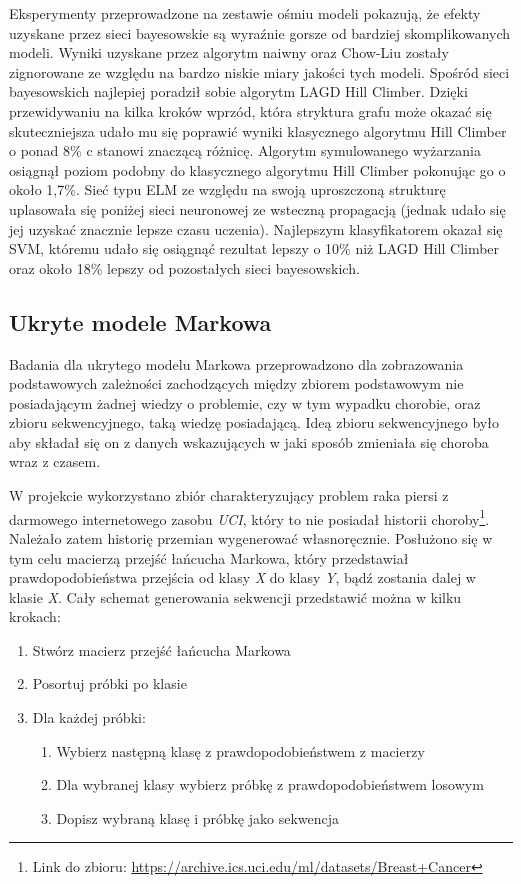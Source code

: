 Eksperymenty przeprowadzone na zestawie ośmiu modeli pokazują, że efekty uzyskane przez sieci bayesowskie są wyraźnie gorsze od bardziej skomplikowanych modeli. Wyniki uzyskane przez algorytm naiwny oraz Chow-Liu  zostały zignorowane ze względu na bardzo niskie miary jakości tych modeli. Spośród sieci bayesowskich najlepiej poradził sobie algorytm LAGD Hill Climber. Dzięki przewidywaniu na kilka kroków wprzód, która stryktura grafu może okazać się skuteczniejsza udało mu się poprawić wyniki klasycznego algorytmu Hill Climber o ponad 8\% c stanowi znaczącą różnicę. Algorytm symulowanego wyżarzania osiągnął poziom podobny do klasycznego algorytmu Hill Climber pokonując go o około 1,7\%. Sieć typu ELM ze względu na swoją uproszczoną strukturę uplasowała się poniżej sieci neuronowej ze wsteczną propagacją (jednak udało się jej uzyskać znacznie lepsze czasu uczenia).  Najlepszym klasyfikatorem okazał się SVM, któremu udało się osiągnąć rezultat lepszy o 10\% niż LAGD Hill Climber oraz około 18\% lepszy od pozostałych sieci bayesowskich.  

\newpage

\subsection{Ukryte modele Markowa}

Badania dla ukrytego modelu Markowa przeprowadzono dla zobrazowania podstawowych zależności zachodzących między zbiorem podstawowym nie posiadającym żadnej wiedzy o problemie, czy w tym wypadku chorobie, oraz zbioru sekwencyjnego, taką wiedzę posiadającą. Ideą zbioru sekwencyjnego było aby składał się on z danych wskazujących w jaki sposób zmieniała się choroba wraz z czasem.

W projekcie wykorzystano zbiór charakteryzujący problem raka piersi z darmowego internetowego zasobu \textit{UCI}, który to nie posiadał historii choroby\footnote{Link do zbioru: \url{https://archive.ics.uci.edu/ml/datasets/Breast+Cancer}}. Należało zatem historię przemian wygenerować własnoręcznie. Posłużono się w tym celu macierzą przejść łańcucha Markowa, który przedstawiał prawdopodobieństwa przejścia od klasy \textit{X} do klasy \textit{Y}, bądź zostania dalej w klasie \textit{X}. Cały schemat generowania sekwencji przedstawić można w kilku krokach:
\\
\begin{enumerate}
  \item Stwórz macierz przejść łańcucha Markowa
  \item Posortuj próbki po klasie
  \item Dla każdej próbki:
    \begin{enumerate}
    \item Wybierz następną klasę z prawdopodobieństwem z macierzy
    \item Dla wybranej klasy wybierz próbkę z prawdopodobieństwem losowym
    \item Dopisz wybraną klasę i próbkę jako sekwencja
    \end{enumerate}
\end{enumerate}

